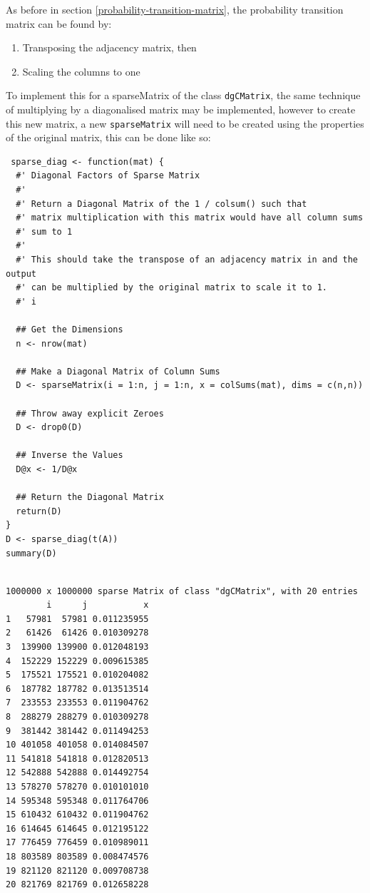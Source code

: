 \documentclass[11pt]{article}
\begin{document}
\begin{enumerate}
As before in section \ref{probability-transition-matrix}, the probability transition matrix can be found by:

\begin{enumerate}
\item Transposing the adjacency matrix, then
\item Scaling the columns to one
\end{enumerate}

To implement this for a sparseMatrix of the class \texttt{dgCMatrix}, the same technique of multiplying by a diagonalised matrix may be implemented, however to create this new matrix, a new \texttt{sparseMatrix} will need to be created using the properties of the original matrix, this can be done like so:


\lstset{language=r,label= ,caption= ,captionpos=b,numbers=none}
\begin{lstlisting}
 sparse_diag <- function(mat) {
  #' Diagonal Factors of Sparse Matrix
  #'
  #' Return a Diagonal Matrix of the 1 / colsum() such that
  #' matrix multiplication with this matrix would have all column sums
  #' sum to 1
  #'
  #' This should take the transpose of an adjacency matrix in and the output
  #' can be multiplied by the original matrix to scale it to 1.
  #' i

  ## Get the Dimensions
  n <- nrow(mat)

  ## Make a Diagonal Matrix of Column Sums
  D <- sparseMatrix(i = 1:n, j = 1:n, x = colSums(mat), dims = c(n,n))

  ## Throw away explicit Zeroes
  D <- drop0(D)

  ## Inverse the Values
  D@x <- 1/D@x

  ## Return the Diagonal Matrix
  return(D)
}
D <- sparse_diag(t(A))
summary(D)
\end{lstlisting}

\begin{verbatim}

1000000 x 1000000 sparse Matrix of class "dgCMatrix", with 20 entries
        i      j           x
1   57981  57981 0.011235955
2   61426  61426 0.010309278
3  139900 139900 0.012048193
4  152229 152229 0.009615385
5  175521 175521 0.010204082
6  187782 187782 0.013513514
7  233553 233553 0.011904762
8  288279 288279 0.010309278
9  381442 381442 0.011494253
10 401058 401058 0.014084507
11 541818 541818 0.012820513
12 542888 542888 0.014492754
13 578270 578270 0.010101010
14 595348 595348 0.011764706
15 610432 610432 0.011904762
16 614645 614645 0.012195122
17 776459 776459 0.010989011
18 803589 803589 0.008474576
19 821120 821120 0.009708738
20 821769 821769 0.012658228
\end{verbatim}


\end{enumerate}
\end{document}

